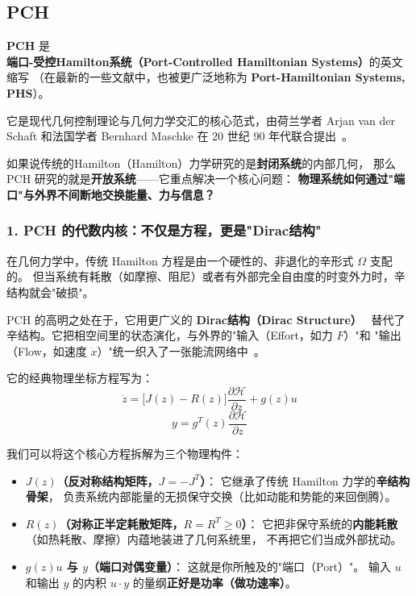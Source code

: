 ﻿\documentclass[10pt,a4paper]{article}
\begin{document}
\subsection{PCH}



\begin{framed}

\textbf{PCH} 是 \textbf{端口-受控Hamilton系统（Port-Controlled Hamiltonian Systems）}的英文缩写
（在最新的一些文献中，也被更广泛地称为 \textbf{Port-Hamiltonian Systems, PHS}）。

它是现代几何控制理论与几何力学交汇的核心范式，由荷兰学者 Arjan van der Schaft 和法国学者
Bernhard Maschke 在 20 世纪 90 年代联合提出~\cite{MaschkeVanDerSchaft1992,VanDerSchaftJeltsema2014}。

如果说传统的Hamilton（Hamilton）力学研究的是\textbf{封闭系统}的内部几何，
那么 PCH 研究的就是\textbf{开放系统}——它重点解决一个核心问题：
\textbf{物理系统如何通过"端口"与外界不间断地交换能量、力与信息？}

\subsubsection*{1. PCH 的代数内核：不仅是方程，更是"Dirac结构"}

在几何力学中，传统 Hamilton 方程是由一个硬性的、非退化的辛形式 $\Omega$ 支配的。
但当系统有耗散（如摩擦、阻尼）或者有外部完全自由度的时变外力时，辛结构就会"破损"。

PCH 的高明之处在于，它用更广义的 \textbf{Dirac结构（Dirac Structure）}~\cite{Courant1990}
替代了辛结构。它把相空间里的状态演化，与外界的"输入（Effort，如力 $F$）"和
"输出（Flow，如速度 $\dot{x}$）"统一织入了一张能流网络中~\cite{VanDerSchaftMaschke2002,VanDerSchaftJeltsema2014}。

它的经典物理坐标方程写为：
\begin{equation}
  \dot{z} = \bigl[J(z) - R(z)\bigr] \frac{\partial \mathcal{H}}{\partial z} + g(z)u
\end{equation}
\begin{equation}
  y = g^T(z) \frac{\partial \mathcal{H}}{\partial z}
\end{equation}

我们可以将这个核心方程拆解为三个物理构件：
\begin{itemize}
  \item \textbf{$J(z)$（反对称结构矩阵，$J = -J^T$）}：
  它继承了传统 Hamilton 力学的\textbf{辛结构骨架}，
  负责系统内部能量的无损保守交换（比如动能和势能的来回倒腾）。
  \item \textbf{$R(z)$（对称正半定耗散矩阵，$R = R^T \ge 0$）}：
  它把非保守系统的\textbf{内能耗散}（如热耗散、摩擦）内蕴地装进了几何系统里，
  不再把它们当成外部扰动。
  \item \textbf{$g(z)u$ 与 $y$（端口对偶变量）}：
  这就是你所触及的"端口（Port）"。
  输入 $u$ 和输出 $y$ 的内积 $u \cdot y$ 的量纲\textbf{正好是功率（做功速率）}。
\end{itemize}


\end{framed}
\end{document}
